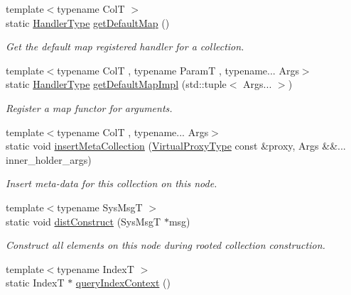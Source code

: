 \begin{DoxyCompactItemize}
\item 
{\footnotesize template$<$typename ColT $>$ }\\static \hyperlink{namespacevt_af64846b57dfcaf104da3ef6967917573}{Handler\+Type} \hyperlink{structvt_1_1vrt_1_1collection_1_1_collection_manager_aa371f1cdd4eafa9f75b7eb40a6f151e0}{get\+Default\+Map} ()
\begin{DoxyCompactList}\small\item\em Get the default map registered handler for a collection. \end{DoxyCompactList}\item 
{\footnotesize template$<$typename ColT , typename ParamT , typename... Args$>$ }\\static \hyperlink{namespacevt_af64846b57dfcaf104da3ef6967917573}{Handler\+Type} \hyperlink{structvt_1_1vrt_1_1collection_1_1_collection_manager_ae92ad81b99b380b0b87b85f7dbda767a}{get\+Default\+Map\+Impl} (std\+::tuple$<$ Args... $>$)
\begin{DoxyCompactList}\small\item\em Register a map functor for arguments. \end{DoxyCompactList}\item 
{\footnotesize template$<$typename ColT , typename... Args$>$ }\\static void \hyperlink{structvt_1_1vrt_1_1collection_1_1_collection_manager_a1220f88fee25f84133a271ff19762b62}{insert\+Meta\+Collection} (\hyperlink{namespacevt_a1b417dd5d684f045bb58a0ede70045ac}{Virtual\+Proxy\+Type} const \&proxy, Args \&\&... inner\+\_\+holder\+\_\+args)
\begin{DoxyCompactList}\small\item\em Insert meta-\/data for this collection on this node. \end{DoxyCompactList}\item 
{\footnotesize template$<$typename Sys\+MsgT $>$ }\\static void \hyperlink{structvt_1_1vrt_1_1collection_1_1_collection_manager_ab82abba567a08d19a26618fe7c65452e}{dist\+Construct} (Sys\+MsgT $\ast$msg)
\begin{DoxyCompactList}\small\item\em Construct all elements on this node during rooted collection construction. \end{DoxyCompactList}\item 
{\footnotesize template$<$typename IndexT $>$ }\\static IndexT $\ast$ \hyperlink{structvt_1_1vrt_1_1collection_1_1_collection_manager_a5364a7039d323f3733b6ab1816cf61d4}{query\+Index\+Context} ()

\end{DoxyCompactItemize}
